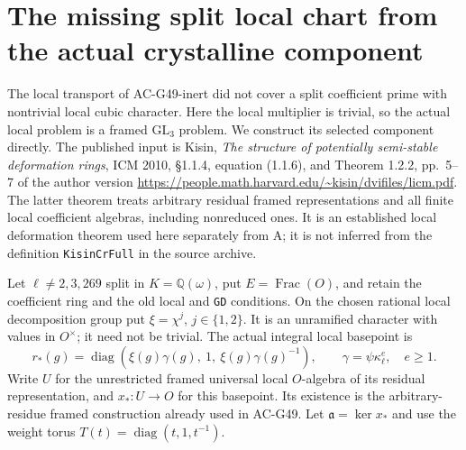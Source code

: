 \section{The missing split local chart from the actual crystalline component}
\label{sec:cubic-split-crystalline-chart}

The local transport of AC-G49-inert did not cover a split
coefficient prime with nontrivial local cubic character.  Here the
local multiplier is trivial, so the actual local problem is a framed
$\mathrm{GL}_3$ problem.  We construct its selected component directly.
The published input is Kisin, \emph{The structure of potentially
semi-stable deformation rings}, ICM 2010, \S1.1.4, equation (1.1.6),
and Theorem 1.2.2, pp.~5--7 of the author version
\url{https://people.math.harvard.edu/~kisin/dvifiles/licm.pdf}.
The latter theorem treats arbitrary residual framed representations
and all finite local coefficient algebras, including nonreduced ones.
It is an established local deformation theorem used here separately
from A; it is not inferred from the definition
\texttt{KisinCrFull} in the source archive.

Let $\ell\ne2,3,269$ split in $K=\mathbb Q(\omega)$, put
$E=\operatorname{Frac}(O)$, and retain the coefficient ring and
the old local and \texttt{GD} conditions.  On the chosen rational
local decomposition group put $\xi=\chi^j$, $j\in\{1,2\}$.
It is an unramified character with values in $O^\times$; it need
not be trivial.  The actual integral local basepoint is
\[
 r_*(g)=\operatorname{diag}
           (\xi(g)\gamma(g),\ 1,\ \xi(g)\gamma(g)^{-1}),
 \qquad \gamma=\psi\kappa_\ell^e,\quad e\ge1.                 \tag{G54.1}
\]
Write $U$ for the unrestricted framed universal local $O$-algebra
of its residual representation, and $x_*:U\to O$ for this
basepoint.  Its existence is the arbitrary-residue framed construction
already used in AC-G49.  Let $\mathfrak a=\ker x_*$ and use the
weight torus $T(t)=\operatorname{diag}(t,1,t^{-1})$.

